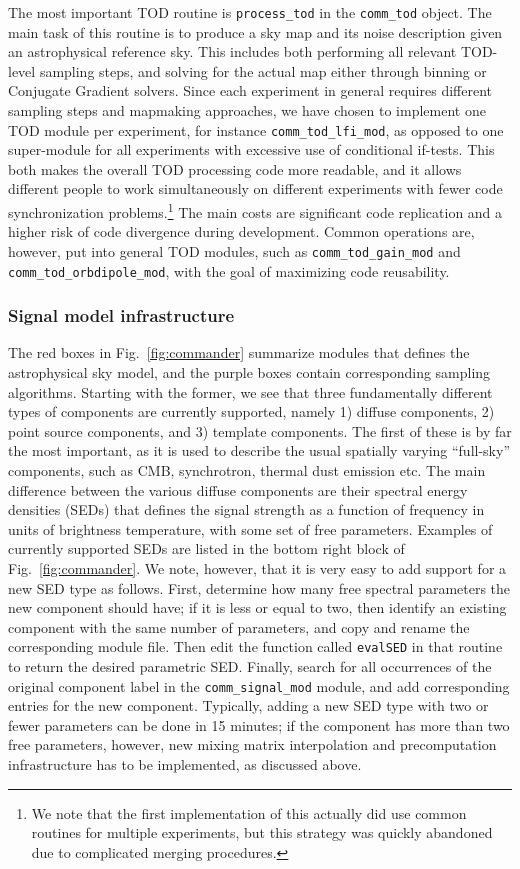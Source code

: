 \documentclass[twocolumn]{aa}
\begin{document}
The most important TOD routine is \texttt{process\_tod} in the
\texttt{comm\_tod} object. The main task of this routine is to produce
a sky map and its noise description given an astrophysical reference
sky. This includes both performing all relevant TOD-level sampling
steps, and solving for the actual map either through binning or
Conjugate Gradient solvers. Since each experiment in general requires
different sampling steps and mapmaking approaches, we have chosen to
implement one TOD module per experiment, for instance
\texttt{comm\_tod\_lfi\_mod}, as opposed to one super-module for all
experiments with excessive use of conditional if-tests. This both
makes the overall TOD processing code more readable, and it allows
different people to work simultaneously on different experiments with
fewer code synchronization problems.\footnote{We note that the first
  implementation of this actually did use common routines for multiple
  experiments, but this strategy was quickly abandoned due to
  complicated merging procedures.} The main costs are significant
code replication and a higher risk of code divergence during
development. Common operations are, however, put into general TOD
modules, such as \texttt{comm\_tod\_gain\_mod} and
\texttt{comm\_tod\_orbdipole\_mod}, with the goal of maximizing code
reusability.

\subsubsection{Signal model infrastructure}

The red boxes in Fig.~\ref{fig:commander} summarize modules that
defines the astrophysical sky model, and the purple boxes contain
corresponding sampling algorithms. Starting with the former, we see
that three fundamentally different types of components are currently
supported, namely 1) diffuse components, 2) point source components,
and 3) template components. The first of these is by far the most
important, as it is used to describe the usual spatially varying
``full-sky'' components, such as CMB, synchrotron, thermal dust
emission etc. The main difference between the various diffuse
components are their spectral energy densities (SEDs) that defines the
signal strength as a function of frequency in units of brightness
temperature, with some set of free parameters. Examples of currently
supported SEDs are listed in the bottom right block of
Fig.~\ref{fig:commander}. We note, however, that it is very easy to
add support for a new SED type as follows. First, determine how many
free spectral parameters the new component should have; if it is less
or equal to two, then identify an existing component with the same
number of parameters, and copy and rename the corresponding module file. Then edit the function
called \texttt{evalSED} in that routine to return the desired
parametric SED. Finally, search for all occurrences of the original
component label in the \texttt{comm\_signal\_mod} module, and add
corresponding entries for the new component. Typically, adding a new
SED type with two or fewer parameters can be done in 15 minutes; if
the component has more than two free parameters, however, new mixing
matrix interpolation and precomputation infrastructure has to be
implemented, as discussed above.
\end{document}
